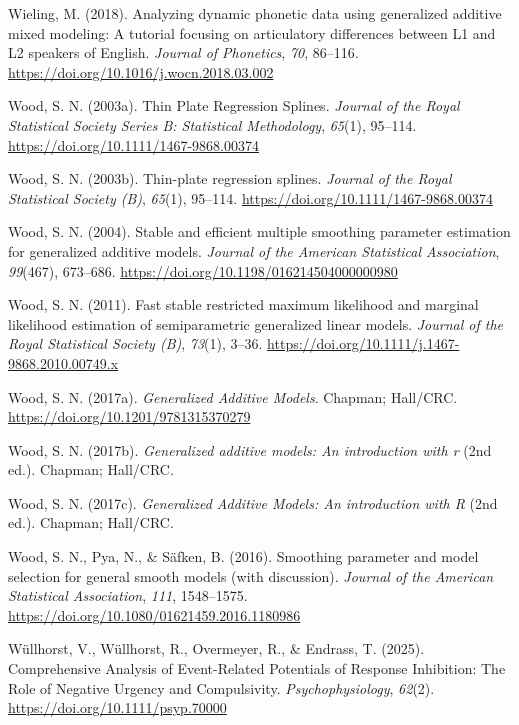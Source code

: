 \documentclass[
  doc,
  floatsintext,
  longtable,
  a4paper,
  nolmodern,
  notxfonts,
  notimes,
  colorlinks=true,linkcolor=blue,citecolor=blue,urlcolor=blue]{apa7}
\newlength{\cslhangindent}
\newenvironment{CSLReferences}[2] %
 {\begin{list}{}{%
  \setlength{\itemindent}{0pt}
  \setlength{\leftmargin}{0pt}
  \setlength{\parsep}{0pt}
  \ifodd #1
   \setlength{\leftmargin}{\cslhangindent}
   \setlength{\itemindent}{-1\cslhangindent}
  \fi
  \setlength{\itemsep}{#2\baselineskip}}}
 {\end{list}}
\begin{document}
\begin{CSLReferences}{1}{0}
Wieling, M. (2018). Analyzing dynamic phonetic data using generalized
additive mixed modeling: A tutorial focusing on articulatory differences
between L1 and L2 speakers of English. \emph{Journal of Phonetics},
\emph{70}, 86--116. \url{https://doi.org/10.1016/j.wocn.2018.03.002}

Wood, S. N. (2003a). Thin Plate Regression Splines. \emph{Journal of the
Royal Statistical Society Series B: Statistical Methodology},
\emph{65}(1), 95--114. \url{https://doi.org/10.1111/1467-9868.00374}

Wood, S. N. (2003b). Thin-plate regression splines. \emph{Journal of the
Royal Statistical Society (B)}, \emph{65}(1), 95--114.
\url{https://doi.org/10.1111/1467-9868.00374}

Wood, S. N. (2004). Stable and efficient multiple smoothing parameter
estimation for generalized additive models. \emph{Journal of the
American Statistical Association}, \emph{99}(467), 673--686.
\url{https://doi.org/10.1198/016214504000000980}

Wood, S. N. (2011). Fast stable restricted maximum likelihood and
marginal likelihood estimation of semiparametric generalized linear
models. \emph{Journal of the Royal Statistical Society (B)},
\emph{73}(1), 3--36.
\url{https://doi.org/10.1111/j.1467-9868.2010.00749.x}

Wood, S. N. (2017a). \emph{Generalized Additive Models}. Chapman;
Hall/CRC. \url{https://doi.org/10.1201/9781315370279}

Wood, S. N. (2017b). \emph{Generalized additive models: An introduction
with r} (2nd ed.). Chapman; Hall/CRC.

Wood, S. N. (2017c). \emph{Generalized {A}dditive {M}odels: An
introduction with {R}} (2nd ed.). Chapman; Hall/CRC.

Wood, S. N., Pya, N., \& Säfken, B. (2016). Smoothing parameter and
model selection for general smooth models (with discussion).
\emph{Journal of the American Statistical Association}, \emph{111},
1548--1575. \url{https://doi.org/10.1080/01621459.2016.1180986}

Wüllhorst, V., Wüllhorst, R., Overmeyer, R., \& Endrass, T. (2025).
Comprehensive Analysis of Event{-}Related Potentials of Response
Inhibition: The Role of Negative Urgency and Compulsivity.
\emph{Psychophysiology}, \emph{62}(2).
\url{https://doi.org/10.1111/psyp.70000}


\end{CSLReferences}
\end{document}
